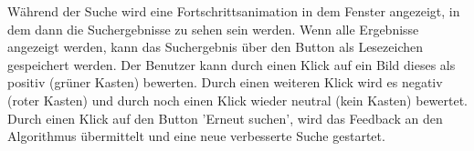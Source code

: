 Während der Suche wird eine Fortschrittsanimation in dem Fenster angezeigt, in dem dann die Suchergebnisse zu sehen sein werden. Wenn alle Ergebnisse angezeigt werden, kann das Suchergebnis über den Button als Lesezeichen gespeichert werden.\newline 
Der Benutzer kann durch einen Klick auf ein Bild dieses als positiv (grüner Kasten) bewerten. Durch einen weiteren Klick wird es negativ (roter Kasten) und durch noch einen Klick wieder neutral (kein Kasten) bewertet. Durch einen Klick auf den Button 'Erneut suchen', wird das Feedback an den Algorithmus übermittelt und eine neue verbesserte Suche gestartet.
